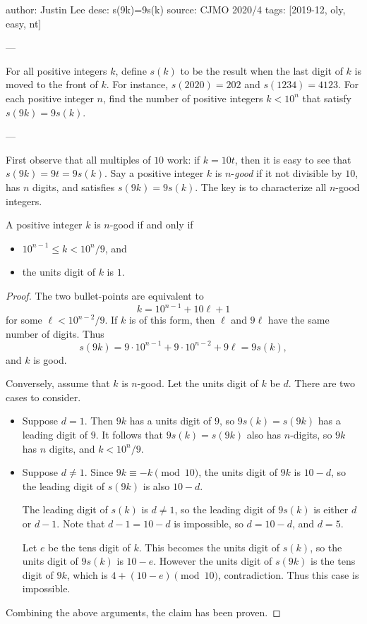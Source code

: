 author: Justin Lee
desc: s(9k)=9s(k)
source: CJMO 2020/4
tags: [2019-12, oly, easy, nt]

---

For all positive integers $k$, define $s(k)$ to be the result when the last digit of $k$ is moved to the front of $k$. For instance, $s(2020)=202$ and $s(1234)=4123$. For each positive integer $n$, find the number of positive integers $k<10^n$ that satisfy $s(9k)=9s(k)$.

---

First observe that all multiples of $10$ work: if $k=10t$, then it is easy to see that $s(9k)=9t=9s(k)$. Say a positive integer $k$ is $n$-\emph{good} if it not divisible by $10$, has $n$ digits, and satisfies $s(9k)=9s(k)$. The key is to characterize all $n$-good integers.
\begin{claim*}
    A positive integer $k$ is $n$-good if and only if
    \begin{itemize}[itemsep=0em]
        \item $10^{n-1}\le k<10^n/9$, and
        \item the units digit of $k$ is $1$.
    \end{itemize}
\end{claim*}
\begin{proof}
    The two bullet-points are equivalent to \[k=10^{n-1}+10\ell+1\]
    for some $\ell<10^{n-2}/9$. If $k$ is of this form, then $\ell$ and $9\ell$ have the same number of digits. Thus \[s(9k)=9\cdot10^{n-1}+9\cdot10^{n-2}+9\ell=9s(k),\]
    and $k$ is good.

    Conversely, assume that $k$ is $n$-good. Let the units digit of $k$ be $d$. There are two cases to consider.
    \begin{itemize}
        \item Suppose $d=1$. Then $9k$ has a units digit of $9$, so $9s(k)=s(9k)$ has a leading digit of $9$. It follows that $9s(k)=s(9k)$ also has $n$-digits, so $9k$ has $n$ digits, and $k<10^n/9$.

        \item Suppose $d\ne1$. Since $9k\equiv -k\pmod{10}$, the units digit of $9k$ is $10-d$, so the leading digit of $s(9k)$ is also $10-d$.

            The leading digit of $s(k)$ is $d\ne1$, so the leading digit of $9s(k)$ is either $d$ or $d-1$. Note that $d-1=10-d$ is impossible, so $d=10-d$, and $d=5$.

            Let $e$ be the tens digit of $k$. This becomes the units digit of $s(k)$, so the units digit of $9s(k)$ is $10-e$. However the units digit of $s(9k)$ is the tens digit of $9k$, which is $4+(10-e)\pmod{10}$, contradiction. Thus this case is impossible.
    \end{itemize}

    Combining the above arguments, the claim has been proven.
\end{proof}

